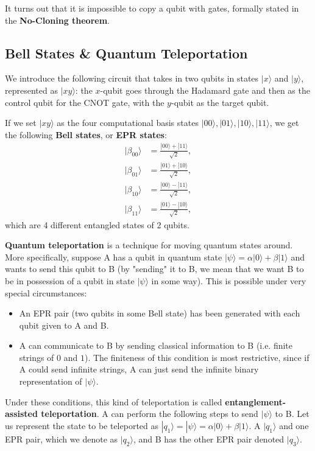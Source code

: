 \documentclass{article}
\theoremstyle{definition}
\begin{document}
It turns out that it is impossible to copy a qubit with gates, formally stated in the \textbf{No-Cloning theorem}.

\subsection*{Bell States \& Quantum Teleportation}
We introduce the following circuit that takes in two qubits in states $|x\rangle$ and $|y\rangle$, represented as $|xy\rangle$: the $x$-qubit goes through the Hadamard gate and then as the control qubit for the CNOT gate, with the $y$-qubit as the target qubit.


If we set $|xy\rangle$ as the four computational basis states $|00\rangle, |01\rangle, |10\rangle, |11\rangle$, we get the following \textbf{Bell states}, or \textbf{EPR states}:
\begin{align*}
  |\beta_{00} \rangle & = \frac{|00\rangle + |11\rangle}{\sqrt{2}}, \\
  |\beta_{01} \rangle & = \frac{|01\rangle + |10\rangle}{\sqrt{2}}, \\
  |\beta_{10} \rangle & = \frac{|00\rangle - |11\rangle}{\sqrt{2}}, \\
  |\beta_{11} \rangle & = \frac{|01\rangle - |10\rangle}{\sqrt{2}},
\end{align*}
which are 4 different entangled states of 2 qubits.

\textbf{Quantum teleportation} is a technique for moving quantum states around. More specifically, suppose A has a qubit in quantum state $|\psi \rangle = \alpha |0\rangle + \beta |1 \rangle$ and wants to send this qubit to B (by "sending" it to B, we mean that we want B to be in possession of a qubit in state $|\psi \rangle$ in some way). This is possible under very special circumstances:
\begin{itemize}
  \item An EPR pair (two qubits in some Bell state) has been generated with each qubit given to A and B.
  \item A can communicate to B by sending classical information to B (i.e. finite strings of $0$ and $1$). The finiteness of this condition is most restrictive, since if A could send infinite strings, A can just send the infinite binary representation of $|\psi\rangle$.
\end{itemize}
Under these conditions, this kind of teleportation is called \textbf{entanglement-assisted teleportation}. A can perform the following steps to send $|\psi \rangle$ to B. Let us represent the state to be teleported as $|q_1 \rangle = |\psi\rangle = \alpha |0\rangle + \beta |1\rangle$. A $|q_1 \rangle$ and one EPR pair, which we denote as $|q_2\rangle$, and B has the other EPR pair denoted $|q_3\rangle$.
\end{document}
